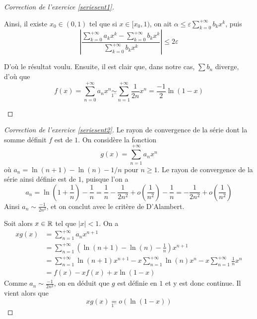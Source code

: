 \begin{proof}[Correction de l'exercice \ref{seriesent1}]
\begin{enumerate}
		Ainsi, il existe $x_0\in(0, 1)$ tel que si $x\in[x_0,1)$, on ait $\alpha \leq \varepsilon\displaystyle\sum_{k=0}^{+\infty}b_kx^k$, puis \[\left |\frac{\displaystyle\sum_{k=0}^{+\infty}a_kx^k-\displaystyle\sum_{k=0}^{+\infty}b_kx^k}{\displaystyle\sum_{k=0}^{+\infty}b_kx^k}\right|\leq 2\varepsilon\]



		D'où le résultat voulu. Ensuite, il est clair que, dans notre cas, $\displaystyle\sum b_n$ diverge, d'où que \[\boxed{f(x)=\sum_{n=0}^{+\infty}a_nx^n\underset{1^-}{\sim}\sum_{n=1}^{+\infty}\frac1{2n}x^n=\frac{-1}2\ln(1-x)}\]
	\end{enumerate}
\end{proof}

\begin{proof}[Correction de l'exercice \ref{seriesent2}]
Le rayon de convergence de la série dont la somme définit $f$ est de $1.$
On considère la fonction 
\[
    g(x)=\displaystyle\sum_{n=1}^{+\infty}a_nx^n
\] où $a_n=\ln(n+1)-\ln(n)-1/n$ pour $n\geq 1$.
Le rayon de convergence de la série ainsi définie est de $1$, puisque l'on a \[a_n=\ln\left(1+\frac1n\right)-\frac1n=\frac1n-\frac1{2n^2}+o\left(\frac1{n^2}\right)-\frac1n=-\frac1{2n^2}+o\left(\frac1{n^2}\right)\] 
Ainsi $a_n\sim\frac{-1}{2n^2}$, et on conclut avec le critère de D'Alambert.

Soit alors $x\in\operatorname{\mathbb R}$ tel que $|x|<1$. On a 
\begin{align*}
	xg(x)&=\displaystyle\sum_{n=1}^{+\infty}a_nx^{n+1}\\
		&=\displaystyle\sum_{n=1}^{+\infty}\left(\ln(n+1)-\ln(n)-\frac1n\right)x^{n+1}\\
		&=\displaystyle\sum_{n=1}^{+\infty}\ln(n+1)x^{n+1}-x\displaystyle\sum_{n=1}^{+\infty}\ln(n)x^n-x\displaystyle\sum_{n=1}^{+\infty}\frac1nx^n\\
		&=f(x)-xf(x)+x\ln(1-x)
\end{align*}
Comme $a_n\sim\frac{-1}{2n^2}$, on en déduit que $g$ est définie en $1$ et y est donc continue. Il vient alors que \[xg(x)\underset{1^{-}}{=}o(\ln(1-x))\]
\end{proof}

